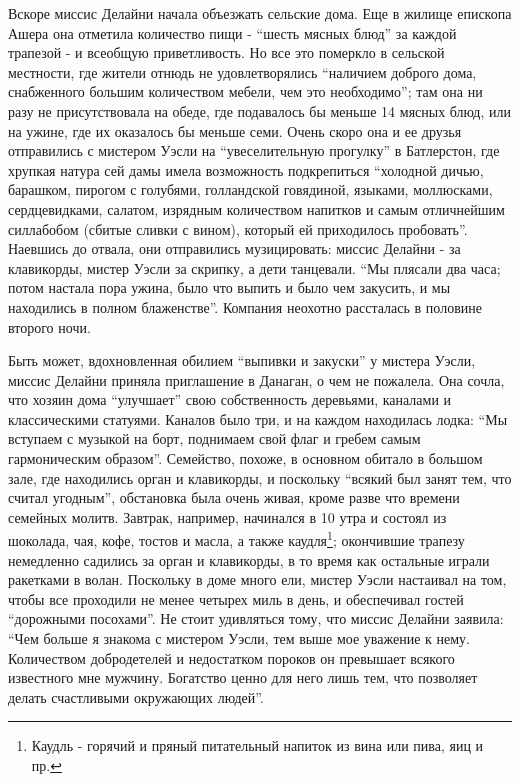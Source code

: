 \documentclass[
  oneside,
  12pt,
  titlepage]{book}
\begin{document}
Вскоре миссис Делайни начала объезжать сельские дома. Еще в жилище епископа Ашера она отметила количество пищи - ``шесть мясных блюд'' за каждой трапезой - и всеобщую приветливость. Но все это померкло в сельской местности, где жители отнюдь не удовлетворялись ``наличием доброго дома, снабженного большим количеством мебели, чем это необходимо''; там она ни разу не присутствовала на обеде, где подавалось бы меньше 14 мясных блюд, или на ужине, где их оказалось бы меньше семи. Очень скоро она и ее друзья отправились с мистером Уэсли на ``увеселительную прогулку'' в Батлерстон, где хрупкая натура сей дамы имела возможность подкрепиться ``холодной дичью, барашком, пирогом с голубями, голландской говядиной, языками, моллюсками, сердцевидками, салатом, изрядным количеством напитков и самым отличнейшим силлабобом (сбитые сливки с вином), который ей приходилось пробовать''. Наевшись до отвала, они отправились музицировать: миссис Делайни - за клавикорды, мистер Уэсли за скрипку, а дети танцевали. ``Мы плясали два часа; потом настала пора ужина, было что выпить и было чем закусить, и мы находились в полном блаженстве''. Компания неохотно рассталась в половине второго ночи.

Быть может, вдохновленная обилием ``выпивки и закуски'' у мистера Уэсли, миссис Делайни приняла приглашение в Данаган, о чем не пожалела. Она сочла, что хозяин дома ``улучшает'' свою собственность деревьями, каналами и классическими статуями. Каналов было три, и на каждом находилась лодка: ``Мы вступаем с музыкой на борт, поднимаем свой флаг и гребем самым гармоническим образом''. Семейство, похоже, в основном обитало в большом зале, где находились орган и клавикорды, и поскольку ``всякий был занят тем, что считал угодным'', обстановка была очень живая, кроме разве что времени семейных молитв. Завтрак, например, начинался в 10 утра и состоял из шоколада, чая, кофе, тостов и масла, а также каудля\footnote{Каудль - горячий и пряный питательный напиток из вина или пива, яиц и пр.}; окончившие трапезу немедленно садились за орган и клавикорды, в то время как остальные играли ракетками в волан. Поскольку в доме много ели, мистер Уэсли настаивал на том, чтобы все проходили не менее четырех миль в день, и обеспечивал гостей ``дорожными посохами''. Не стоит удивляться тому, что миссис Делайни заявила: ``Чем больше я знакома с мистером Уэсли, тем выше мое уважение к нему. Количеством добродетелей и недостатком пороков он превышает всякого известного мне мужчину. Богатство ценно для него лишь тем, что позволяет делать счастливыми окружающих людей''.
\end{document}
